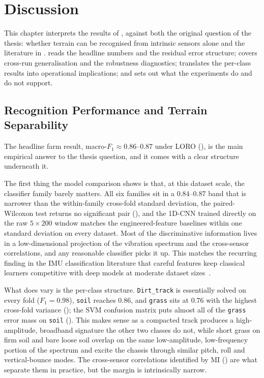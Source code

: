 \chapter{Discussion}
\label{ch:discussion}

This chapter interprets the results of , against both the original question of the thesis: whether terrain can be recognised from intrinsic sensors alone and the literature in .  reads the headline numbers and the residual error structure;  covers cross-run generalisation and the robustness diagnostics;  translates the per-class results into operational implications; and  sets out what the experiments do and do not support.

\section{Recognition Performance and Terrain Separability}
\label{sec:disc_performance}

The headline farm result, macro-$F_1 \approx 0.86$--$0.87$ under LORO (), is the main empirical answer to the thesis question, and it comes with a clear structure underneath it.

The first thing the model comparison shows is that, at this dataset scale, the classifier family barely matters. All six families sit in a $0.84$--$0.87$ band that is narrower than the within-family cross-fold standard deviation, the paired-Wilcoxon test returns no significant pair (), and the 1D-CNN trained directly on the raw $5\times 200$ window matches the engineered-feature baselines within one standard deviation on every dataset. Most of the discriminative information lives in a low-dimensional projection of the vibration spectrum and the cross-sensor correlations, and any reasonable classifier picks it up. This matches the recurring finding in the IMU classification literature that careful features keep classical learners competitive with deep models at moderate dataset sizes~\cite{Weiss2011,Otsu2016,Fawaz2019}.

What does vary is the per-class structure. \texttt{Dirt\_track} is essentially solved on every fold ($F_1 = 0.98$), \texttt{soil} reaches $0.86$, and \texttt{grass} sits at $0.76$ with the highest cross-fold variance (); the SVM confusion matrix puts almost all of the \texttt{grass} error mass on \texttt{soil} (). This makes sense as a compacted track produces a high-amplitude, broadband signature the other two classes do not, while short grass on firm soil and bare loose soil overlap on the same low-amplitude, low-frequency portion of the spectrum and excite the chassis through similar pitch, roll and vertical-bounce modes. The cross-sensor correlations identified by MI () are what separate them in practice, but the margin is intrinsically narrow.

